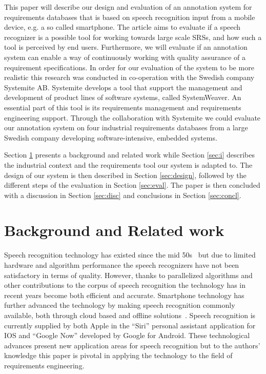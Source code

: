 \documentclass[conference]{IEEEtran}
\begin{document}
This paper will describe our design and evaluation of an annotation system for requirements databases that is based on speech recognition input from a mobile device, e.g. a so called smartphone. The article aims to evaluate if a speech recognizer is a possible tool for working towards large scale SRSs, and how such a tool is perceived by end users. Furthermore, we will evaluate if an annotation system 
can enable a way of continuously working with quality assurance of a requirement specifications.
In order for our evaluation of the system to be more realistic this research was conducted in co-operation with the Swedish company Systemite AB. Systemite develops a tool that support the management and development of product lines of software systems, called SystemWeaver.
An essential part of this tool is its requirements management and requirements engineering support.
Through the collaboration with Systemite we could evaluate our annotation system on four industrial requirements databases from a large Swedish company developing software-intensive, embedded systems.

Section \ref{sec:b} presents a background and related work while Section \ref{sec:i} describes the industrial context and the requirements tool our system is adapted to.
The design of our system is then described in Section \ref{sec:design}, followed by the different steps of the evaluation in Section \ref{sec:eval}.
The paper is then concluded with a discussion in Section \ref{sec:disc} and conclusions in Section \ref{sec:concl}.

\section{Background and Related work}
\label{sec:b}
Speech recognition technology has existed since the mid 50s~\cite{davis1952} but due to limited hardware and algorithm performance the speech recognizers have not been satisfactory in terms of quality.
However, thanks to parallelized algorithms and other contributions to the corpus of speech recognition the technology has in recent years become both efficient and accurate. 
Smartphone technology has further advanced the technology by making speech recognition commonly available, both through cloud based and offline solutions~\cite{androidIO2012}.
Speech recognition is currently supplied by both Apple in the ``Siri'' personal assistant application for IOS and ``Google Now'' developed by Google for Android.
These technological advances present new application areas for speech recognition but to the authors' knowledge this paper is pivotal in applying the technology to the field of requirements engineering. 
\end{document}
